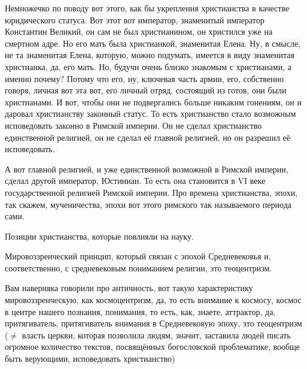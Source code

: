 Немножечко по поводу вот этого, как бы
укрепления христианства в качестве юридического статуса. Вот этот вот император,
знаменитый император Константин Великий, он сам не был христианином, он
христился уже на смертном адре. Но его мать была христианкой, знаменитая Елена.
Ну, в смысле, не та знаменитая Елена, которую, можно подумать, имеется в виду
знаменитая христианка, да, его мать. Но, будучи очень близко знакомым с
христианами, а именно почему? Потому что его, ну, ключевая часть армии, его,
собственно говоря, личная вот эта вот, его личный отряд, состоящий из готов, они
были христианами. И вот, чтобы они не подвергались больше никаким гонениям, он и
даровал христианству законный статус. То есть христианство стало возможным
исповедовать законно в Римской империи. Он не сделал христианство единственной
религией, он не сделал её главной религией, но он разрешил её исповедовать. 

А
вот главной религией, и уже единственной возможной в Римской империи, сделал
другой император, Юстиниан. То есть она становится в VI веке государственной
религией Римской империи. Про времена христианства, эпохи, так скажем,
мученичества, эпохи вот этого римского так называемого периода сами.

Позиции христианства, которые повлияли на науку. 

Мировоззренческий принцип, который связан
с эпохой Средневековья и, соответственно, с средневековым пониманием религии,
это теоцентризм. 

Вам наверняка говорили про античность, вот такую характеристику
мировоззренческую, как космоцентризм, да, то есть внимание к космосу, космос в
центре нашего познания, понимания, то есть, как, знаете, аттрактор, да,
притягиватель, притягиватель внимания в Средневековую эпоху, это теоцентризм ($\neq$ власть церкви, которая позволила людям, значит, заставила
людей писать огромное количество текстов, посвящённых богословской проблематике,
вообще быть верующими, исповедовать христианство) 

